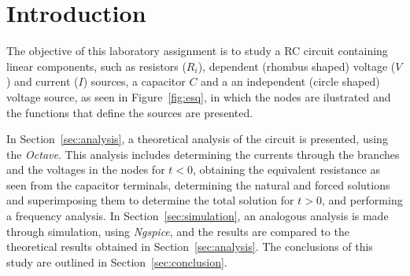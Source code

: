 \section{Introduction}
\label{sec:introduction}

The objective of this laboratory assignment is to study a RC circuit containing linear components, 
such as resistors ($R_i$), dependent (rhombus shaped) voltage ($V$) and current ($I$) 
sources, a capacitor $C$ and a an independent (circle shaped) voltage source, as seen in Figure~\ref{fig:esq}, in which the nodes are ilustrated and the functions that define the sources are presented.


In Section~\ref{sec:analysis}, a theoretical analysis of the circuit is
presented, using the \textit{Octave}. This analysis includes determining the currents through the branches and the voltages in the nodes for $t<0$, obtaining the equivalent resistance as seen from the capacitor terminals, determining the natural and forced solutions and superimposing them to determine the total solution for $t>0$, and performing a frequency analysis. 
In Section~\ref{sec:simulation}, an analogous analysis is made through simulation, using \textit{Ngspice}, and the results are compared to the theoretical results obtained in
Section~\ref{sec:analysis}. The conclusions of this study are outlined in
Section~\ref{sec:conclusion}.





